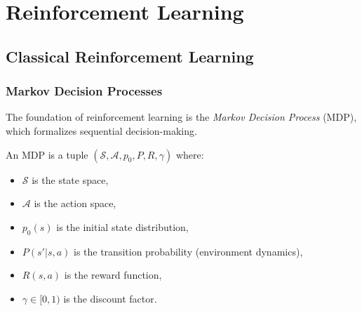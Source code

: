 \part{Reinforcement Learning}

\chapter{Classical Reinforcement Learning}
\label{ch:classical-rl}

\section{Markov Decision Processes}

The foundation of reinforcement learning is the \emph{Markov Decision Process} (MDP), which formalizes sequential decision-making.

\begin{definition}
    An MDP is a tuple $(\mathcal{S}, \mathcal{A}, p_0, P, R, \gamma)$ where:
    \begin{itemize}
        \item $\mathcal{S}$ is the state space,
        \item $\mathcal{A}$ is the action space,
        \item $p_0(s)$ is the initial state distribution,
        \item $P(s' | s, a)$ is the transition probability (environment dynamics),
        \item $R(s, a)$ is the reward function,
        \item $\gamma \in [0,1)$ is the discount factor.
    \end{itemize}
\end{definition}

